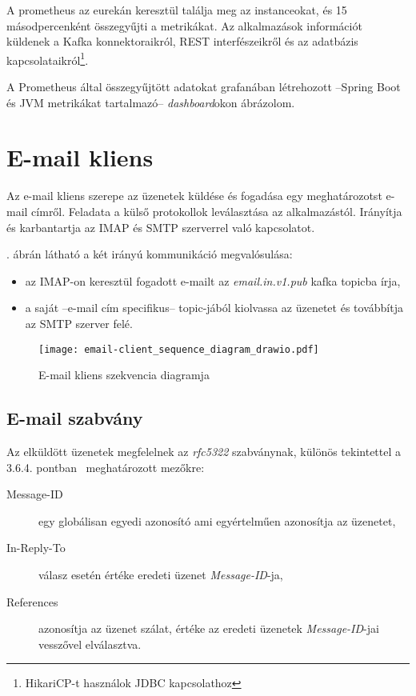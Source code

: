 A prometheus az eurekán keresztül találja meg az instanceokat, és 15 másodpercenként összegyűjti a metrikákat. Az alkalmazások információt küldenek a Kafka konnektoraikról, REST interfészeikről és az adatbázis kapcsolataikról\footnote{HikariCP-t használok JDBC kapcsolathoz}.

A Prometheus által összegyűjtött adatokat grafanában létrehozott --Spring Boot és JVM metrikákat tartalmazó-- \textit{dashboard}okon ábrázolom.


\section{E-mail kliens}
Az e-mail kliens szerepe az üzenetek küldése és fogadása egy meghatározotst e-mail címről. Feladata a külső protokollok leválasztása az alkalmazástól. Irányítja és karbantartja az IMAP és SMTP szerverrel való kapcsolatot.

. ábrán látható a két irányú kommunikáció megvalósulása:
\begin{itemize}
	\item az IMAP-on keresztül fogadott e-mailt az \textit{email.in.v1.pub} kafka topicba írja,
	\item a saját --e-mail cím specifikus-- topic-jából kiolvassa az üzenetet és továbbítja  az SMTP szerver felé.
\end{itemize}


\begin{figure}[hbt] 
	\centering
	\texttt{[image: email-client\_sequence\_diagram\_drawio.pdf]}
	\caption{E-mail kliens szekvencia diagramja}
	\label{fig:email-client_sequence_diagram}
\end{figure}




\subsection{E-mail szabvány}
Az elküldött üzenetek megfelelnek az \textit{rfc5322} szabványnak, különös tekintettel a 3.6.4. pontban~\cite{rfc5322_Identification_Fields} meghatározott mezőkre:

\begin{description}
	\item[Message-ID] egy globálisan egyedi azonosító ami egyértelműen azonosítja az üzenetet,
	
	\item[In-Reply-To] válasz esetén értéke eredeti üzenet \textit{Message-ID}-ja,
	
	\item[References] azonosítja az üzenet szálat, értéke az eredeti üzenetek \textit{Message-ID}-jai vesszővel elválasztva.
\end{description}


